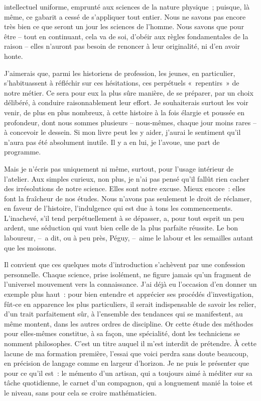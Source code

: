 \documentclass[french,twoside]{book} %
\newcommand{\astermono}{\medskip\centerline{\color{rubric}\large\selectfont{\syms ✻}}\medskip\par}%
\begin{document}
\label{pXVII} intellectuel uniforme, emprunté aux sciences de la nature physique ; puisque, là même, ce gabarit a cessé de s’appliquer tout entier. Nous ne savons pas encore très bien ce que seront un jour les sciences de l’homme. Nous savons que pour être – tout en continuant, cela va de soi, d’obéir aux règles fondamentales de la raison – elles n’auront pas besoin de renoncer à leur originalité, ni d’en avoir honte.\par
J’aimerais que, parmi les historiens de profession, les jeunes, en parti­culier, s’habituassent à réfléchir sur ces hésitations, ces perpétuels « re­pentirs » de notre métier. Ce sera pour eux la plus sûre manière, de se préparer, par un choix délibéré, à conduire raisonnablement leur effort. Je souhaiterais surtout les voir venir, de plus en plus nombreux, à cette histoire à la fois élargie et poussée en profondeur, dont nous sommes plusieurs – nous‑mêmes, chaque jour moins rares – à concevoir le dessein. Si mon livre peut les y aider, j’aurai le sentiment qu’il n’aura pas été absolument inutile. Il y a en lui, je l’avoue, une part de programme.\par
Mais je n’écris pas uniquement ni même, surtout, pour l’usage intérieur de l’atelier. Aux simples curieux, non plus, je n’ai pas pensé qu’il fallût rien cacher des irrésolutions de notre science. Elles sont notre excuse. Mieux encore : elles font la fraîcheur de nos études. Nous n’avons pas seulement le droit de réclamer, en faveur de l’histoire, l’indulgence qui est due à tons les commencements. L’inachevé, s’il tend perpétuellement à se dépasser, a, pour tout esprit un peu ardent, une séduction qui vaut bien celle de la plus parfaite réussite. Le bon laboureur, – a dit, ou à peu près, Péguy, – aime le labour et les semailles autant que les moissons.\par

\astermono

\noindent Il convient que ces quelques mots d’introduction s’achèvent par une confession personnelle. Chaque science, prise isolément, ne figure jamais qu’un fragment de l’universel mouvement vers la connaissance. J’ai déjà eu l’occasion d’en donner un exemple plus haut : pour bien entendre et apprécier ses procédés d’investigation, fût‑ce en apparence les plus par­ticuliers, il serait indispensable de savoir les relier, d’un trait parfaitement sûr, à l’ensemble des tendances qui se manifestent, au même montent, dans les autres ordres de discipline. Or cette étude des méthodes pour elles‑mêmes constitue, à sa façon, une spécialité, dont les techniciens se nomment philosophes. C’est un titre auquel il m’est interdit de pré­tendre. À cette lacune de ma formation première, l’essai que voici perdra sans doute beaucoup, en précision de langage comme en largeur d’hori­zon. Je ne puis le présenter que pour ce qu’il est : le mémento d’un artisan, qui a toujours aimé à méditer sur sa tâche quotidienne, le carnet d’un compagnon, qui a longuement manié la toise et le niveau, sans pour cela se croire mathématicien.
\end{document}

